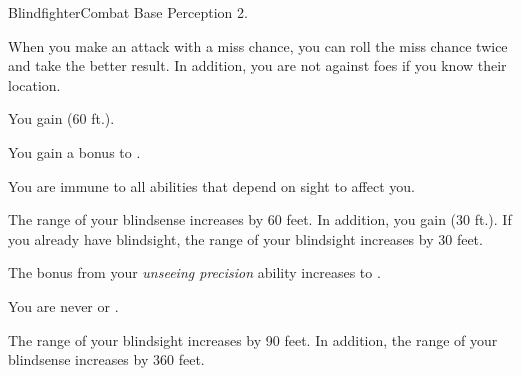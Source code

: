     \begin{feat}{Blindfighter}{Combat}
        \featpre Base Perception 2.

         When you make an attack with a miss chance, you can roll the miss chance twice and take the better result.
        In addition, you are not \partiallyunaware against foes if you know their location.

         You gain  (60 ft.).

         You gain a  bonus to .

         You are immune to all abilities that depend on sight to affect you.

         The range of your blindsense increases by 60 feet.
        In addition, you gain  (30 ft.).
        If you already have blindsight, the range of your blindsight increases by 30 feet.

         The bonus from your \textit{unseeing precision} ability increases to .

         You are never \unaware or \partiallyunaware.

         The range of your blindsight increases by 90 feet.
        In addition, the range of your blindsense increases by 360 feet.
    \end{feat}

